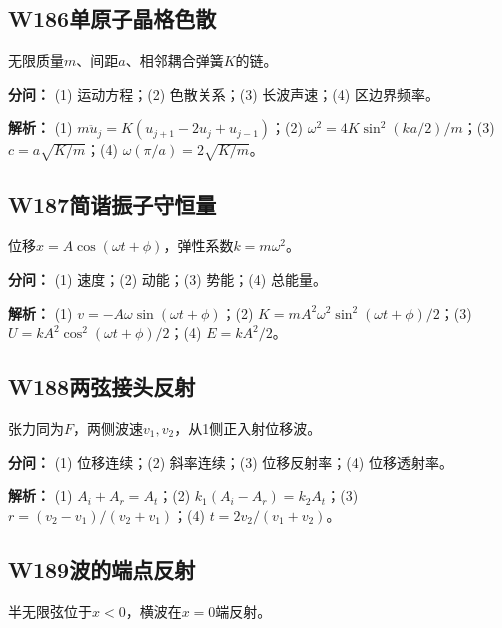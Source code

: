 \medskip

\subsection*{W186\quad 单原子晶格色散}

无限质量$m$、间距$a$、相邻耦合弹簧$K$的链。

\par\textbf{分问：} (1) 运动方程；(2) 色散关系；(3) 长波声速；(4) 区边界频率。

\par\textbf{解析：} (1) $m\ddot u_j=K(u_{j+1}-2u_j+u_{j-1})$；(2) $\omega^2=4K\sin^2(ka/2)/m$；(3) $c=a\sqrt{K/m}$；(4) $\omega(\pi/a)=2\sqrt{K/m}$。

\medskip

\subsection*{W187\quad 简谐振子守恒量}

位移$x=A\cos(\omega t+\phi)$，弹性系数$k=m\omega^2$。

\par\textbf{分问：} (1) 速度；(2) 动能；(3) 势能；(4) 总能量。

\par\textbf{解析：} (1) $v=-A\omega\sin(\omega t+\phi)$；(2) $K=mA^2\omega^2\sin^2(\omega t+\phi)/2$；(3) $U=kA^2\cos^2(\omega t+\phi)/2$；(4) $E=kA^2/2$。

\medskip

\subsection*{W188\quad 两弦接头反射}

张力同为$F$，两侧波速$v_1,v_2$，从1侧正入射位移波。

\par\textbf{分问：} (1) 位移连续；(2) 斜率连续；(3) 位移反射率；(4) 位移透射率。

\par\textbf{解析：} (1) $A_i+A_r=A_t$；(2) $k_1(A_i-A_r)=k_2A_t$；(3) $r=(v_2-v_1)/(v_2+v_1)$；(4) $t=2v_2/(v_1+v_2)$。

\medskip

\subsection*{W189\quad 波的端点反射}

半无限弦位于$x<0$，横波在$x=0$端反射。

